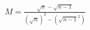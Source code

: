 \documentclass[preview]{standalone}
\begin{document}
\begin{align*}
M = \frac{\sqrt{n}-\sqrt{n-1}} {(\sqrt{n})^2 - (\sqrt{n-1}^2)}
\end{align*}
\end{document}
